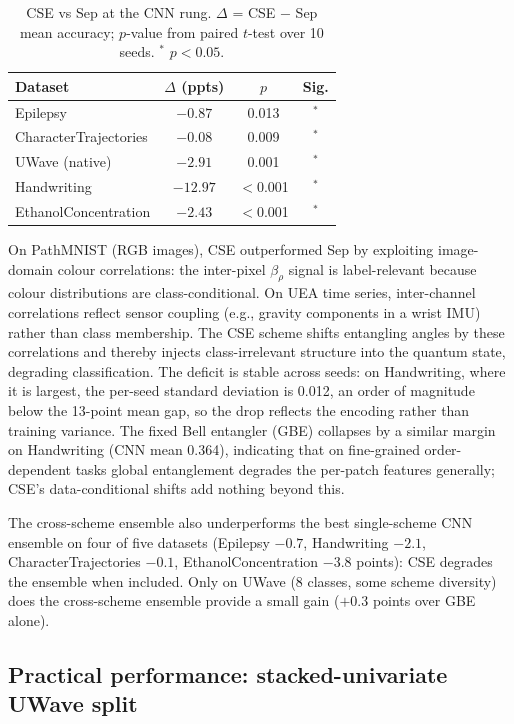 \documentclass[conference,compsoc]{IEEEtran}
\begin{document}
\begin{table}[t]
\caption{CSE vs Sep at the CNN rung. $\Delta$ = CSE $-$ Sep mean
accuracy; $p$-value from paired $t$-test over 10 seeds.
$^*$ $p < 0.05$.}
\label{tab:cse}
\centering
\begin{tabular}{lccc}
\toprule
Dataset & $\Delta$ (ppts) & $p$ & Sig. \\
\midrule
Epilepsy              & $-0.87$ & 0.013 & $^*$ \\
CharacterTrajectories & $-0.08$ & 0.009 & $^*$ \\
UWave (native)        & $-2.91$ & 0.001 & $^*$ \\
Handwriting           & $-12.97$& $<$0.001 & $^*$ \\
EthanolConcentration  & $-2.43$ & $<$0.001 & $^*$ \\
\bottomrule
\end{tabular}
\end{table}

On PathMNIST (RGB images), CSE outperformed Sep by exploiting
image-domain colour correlations: the inter-pixel $\beta_\rho$ signal
is label-relevant because colour distributions are class-conditional.
On UEA time series, inter-channel correlations reflect sensor
coupling (e.g., gravity components in a wrist IMU) rather than class
membership.
The CSE scheme shifts entangling angles by these correlations and
thereby injects class-irrelevant structure into the quantum state,
degrading classification.
The deficit is stable across seeds: on Handwriting, where it is
largest, the per-seed standard deviation is 0.012, an order of
magnitude below the 13-point mean gap, so the drop reflects the
encoding rather than training variance. The fixed Bell entangler (GBE)
collapses by a similar margin on Handwriting (CNN mean 0.364),
indicating that on fine-grained order-dependent tasks global
entanglement degrades the per-patch features generally; CSE's
data-conditional shifts add nothing beyond this.

The cross-scheme ensemble also underperforms the best single-scheme
CNN ensemble on four of five datasets (Epilepsy $-0.7$, Handwriting
$-2.1$, CharacterTrajectories $-0.1$, EthanolConcentration $-3.8$
points): CSE degrades the ensemble when included.
Only on UWave (8 classes, some scheme diversity) does the cross-scheme
ensemble provide a small gain ($+0.3$ points over GBE alone).

\subsection{Practical performance: stacked-univariate UWave split}
\label{sec:utility}
\end{document}
